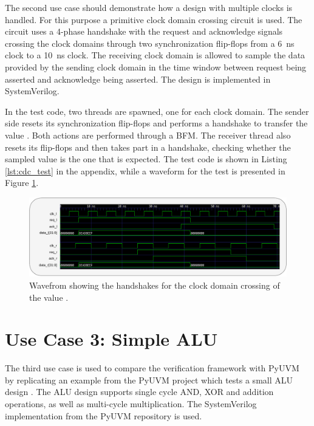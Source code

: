 The second use case should demonstrate how a design with multiple clocks is handled. For this purpose a primitive
clock domain crossing circuit is used. The circuit uses a 4-phase handshake with the request and acknowledge signals
crossing the clock domains through two synchronization flip-flops from a \SI{6}{ns} clock to a \SI{10}{ns} clock. The
receiving clock domain is allowed to sample the data provided by the sending clock domain in the time window between
request being asserted and acknowledge being asserted. The design is implemented in SystemVerilog.

In the test code, two threads are spawned, one for each clock domain. The sender side resets its synchronization
flip-flops and performs a handshake to transfer the value . Both actions are performed through a BFM.
The receiver thread also resets its flip-flops and then takes part in a handshake, checking whether the sampled value
is the one that is expected. The test code is shown in Listing \ref{lst:cdc_test} in the appendix, while a waveform
for the test is presented in Figure \ref{fig:cdc_timing}.

\begin{figure}[t]
  \centering
  \includegraphics[width=\textwidth]{diagrams/cdc_timing.pdf}
  \caption{Wavefrom showing the handshakes for the clock domain crossing of the value .}
  \label{fig:cdc_timing}
\end{figure}

\section{Use Case 3: Simple ALU} %

The third use case is used to compare the verification framework with PyUVM by replicating an example from the PyUVM
project which tests a small ALU design \cite{pyuvm_tinyalu}. The ALU design supports single cycle AND, XOR and
addition operations, as well as multi-cycle multiplication. The SystemVerilog implementation from the PyUVM repository is used.

